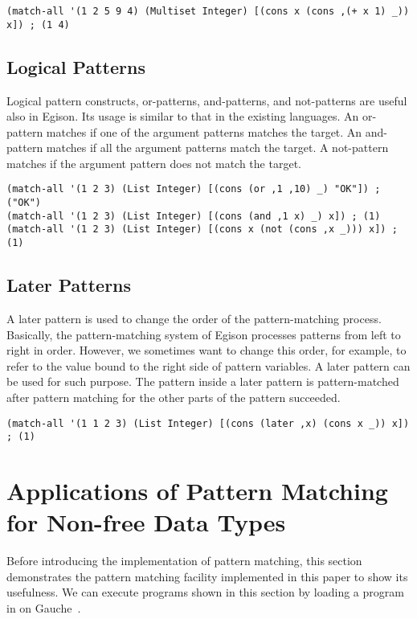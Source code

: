 \documentclass[acmlarge]{acmart}
\begin{document}
\begin{lstlisting}[language=egison]
(match-all '(1 2 5 9 4) (Multiset Integer) [(cons x (cons ,(+ x 1) _)) x]) ; (1 4)
\end{lstlisting}

\subsection{Logical Patterns}

Logical pattern constructs, or-patterns, and-patterns, and not-patterns are useful also in Egison.
Its usage is similar to that in the existing languages.
An or-pattern matches if one of the argument patterns matches the target.
An and-pattern matches if all the argument patterns match the target.
A not-pattern matches if the argument pattern does not match the target.

\begin{lstlisting}[language=egison]
(match-all '(1 2 3) (List Integer) [(cons (or ,1 ,10) _) "OK"]) ; ("OK")
(match-all '(1 2 3) (List Integer) [(cons (and ,1 x) _) x]) ; (1)
(match-all '(1 2 3) (List Integer) [(cons x (not (cons ,x _))) x]) ; (1)
\end{lstlisting}

\subsection{Later Patterns}

A later pattern is used to change the order of the pattern-matching process.
Basically, the pattern-matching system of Egison processes patterns from left to right in order.
However, we sometimes want to change this order, for example, to refer to the value bound to the right side of pattern variables.
A later pattern can be used for such purpose.
The pattern inside a later pattern is pattern-matched after pattern matching for the other parts of the pattern succeeded.

\begin{lstlisting}[language=egison]
(match-all '(1 1 2 3) (List Integer) [(cons (later ,x) (cons x _)) x]) ; (1)
\end{lstlisting}


\section{Applications of Pattern Matching for Non-free Data Types}\label{apps}

Before introducing the implementation of pattern matching, this section demonstrates the pattern matching facility implemented in this paper to show its usefulness.
We can execute programs shown in this section by loading a program in \cite{egisonScheme} on Gauche~\cite{gaucheWeb}.
\end{document}
